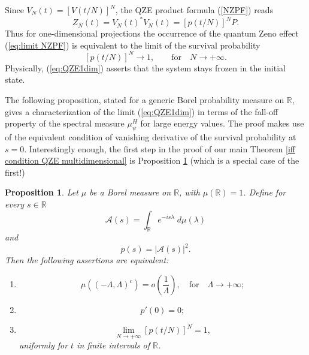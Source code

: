 \documentclass[aip,jmp
]{revtex4}
\newcommand{\RM}{\mathbb{R}}
\newtheorem{proposition}{Proposition}
\theoremstyle{definition}
\begin{document}
Since $V_{N}(t)=[V(t/N)]^N$,
the QZE product formula (\ref{NZPF}) reads
\begin{equation*}
Z_N(t)= V_{N}(t)^{*}V_{N}(t)= [p(t/N)]^N P.
\end{equation*}
Thus for one-dimensional projections the occurrence of the  quantum Zeno effect (\ref{eq:limit NZPF}) is equivalent to the limit of the survival probability
\begin{equation}
\label{eq:QZE1dim}
[p(t/N)]^N \to 1, \qquad \text{for} \quad N \to +\infty.
\end{equation}
Physically, (\ref{eq:QZE1dim}) asserts that the system stays frozen in the initial state.

The following proposition, stated for a generic Borel probability measure on $\RM$, gives a characterization of the limit (\ref{eq:QZE1dim}) in terms of the fall-off property of the spectral measure $\mu_{\psi}^H$ for large energy values. The proof makes use of the equivalent condition of vanishing derivative of the survival probability at $s=0$.
Interestingly enough, the first step in the proof of our main Theorem \ref{iff condition QZE multidimensional} is Proposition \ref{iff condition QZE} (which is a special case of the first!)

\begin{proposition}\label{iff condition QZE}
Let $\mu$ be a Borel measure on   $\RM$, with $\mu(\RM)=1$. Define for every $s \in \RM$
\begin{equation*}
\mathcal{A}(s)=\int_{\RM} e^{-is\lambda}\; d\mu(\lambda)
\end{equation*}
and
\begin{equation*}
p(s)=|\mathcal{A}(s)|^2.
\end{equation*}
Then the following assertions are equivalent:
\begin{enumerate}
    \item \label{fdtc 1D}
    \begin{equation*}
          \mu((-\Lambda,\Lambda)^c) =o\left( \frac{1}{\Lambda} \right), \quad \mathrm{for} \quad \Lambda \to + \infty;
    \end{equation*}
    \item
      \begin{equation*}
        p'(0)=0;
      \end{equation*}
    \item \label{prod. formula 1D}
    \begin{equation*}
      \lim_{N \to +\infty} [p(t/N)]^N=1,
    \end{equation*}
    uniformly for $t$ in finite intervals of $\RM$.
\end{enumerate}
\end{proposition}
\end{document}
